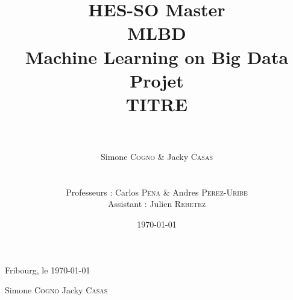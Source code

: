 \documentclass[a4paper, 12pt]{report}
\title{\huge{HES-SO Master} \\ \Huge{\textbf{\textsc{MLBD}}} \\
\LARGE{Machine Learning on Big Data} \\
\vspace{2cm} \huge{\textbf{Projet}} \\ 
\huge{TITRE}}
\author{\\ \\ Simone \textsc{Cogno} \& Jacky \textsc{Casas} \\
\\ \\
Professeurs : Carlos \textsc{Pena} \& Andres \textsc{Perez-Uribe} \\
Assistant : Julien \textsc{Rebetez}}
\date{\today}
\begin{document}
\maketitle %
\newpage

%


%
%


\vspace{3cm}
Fribourg, le \today

\vspace{1cm}

\hspace{2cm} Simone \textsc{Cogno} \hspace{4cm} Jacky \textsc{Casas}

\vspace{2cm}


%
\end{document}
